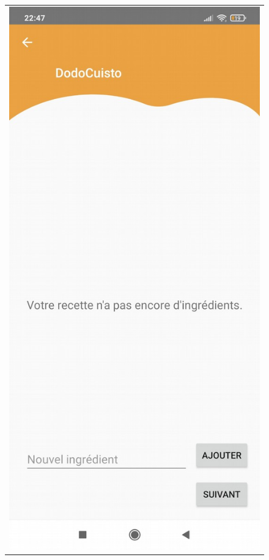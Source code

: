 \documentclass{article}
\begin{document}
\begin{figure}
\begin{tabular}{@{}c@{}}
        \includegraphics[scale=0.2]{add_ingredients.png}
    \end{tabular}
    \begin{tabular}{@{}c@{}}

\end{tabular}
\end{figure}
\end{document}
